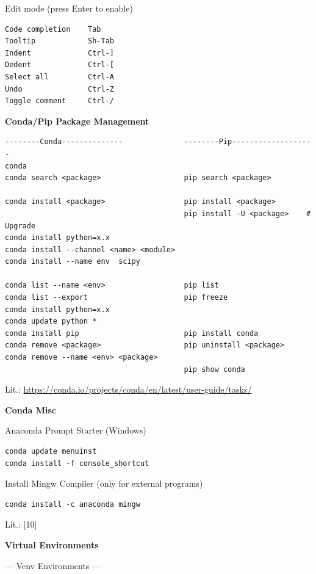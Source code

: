 \documentclass[9pt,a4wide]{extarticle}
\begin{document}
Edit mode (press Enter to enable)

\begin{verbatim}      
Code completion    Tab
Tooltip            Sh-Tab
Indent             Ctrl-]
Dedent             Ctrl-[
Select all         Ctrl-A
Undo               Ctrl-Z
Toggle comment     Ctrl-/
\end{verbatim}      


\medskip
{\bf Conda/Pip Package Management}
{}

\begin{verbatim}
--------Conda--------------              --------Pip-------------------
conda 
conda search <package>                   pip search <package>

conda install <package>                  pip install <package>
                                         pip install -U <package>    # Upgrade
conda install python=x.x  
conda install --channel <name> <module>
conda install --name env  scipy

conda list --name <env>                  pip list
conda list --export                      pip freeze
conda install python=x.x
conda update python *
conda install pip                        pip install conda
conda remove <package>                   pip uninstall <package>
conda remove --name <env> <package>
                                         pip show conda
\end{verbatim}

Lit.: \url{https://conda.io/projects/conda/en/latest/user-guide/tasks/}

\medskip

{\bf Conda Misc}

Anaconda Prompt Starter (Windows)

\begin{verbatim}
conda update menuinst
conda install -f console_shortcut
\end{verbatim}

Install Mingw Compiler (only for external
programs)

\begin{verbatim}
conda install -c anaconda mingw
\end{verbatim}


Lit.: [10]


\medskip
{\bf Virtual Environments}
{}

--- Venv Environments ---
\end{document}
